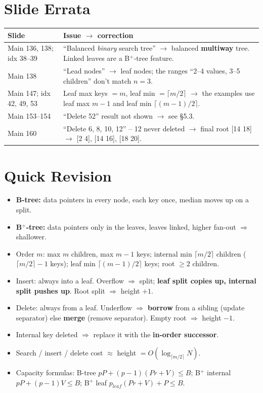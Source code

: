 \documentclass[10pt,a4paper]{article}
\begin{document}
\section{Slide Errata}
\begin{tabularx}{\linewidth}{@{}l X@{}}
\toprule
\textbf{Slide} & \textbf{Issue $\to$ correction}\\\midrule
Main 136, 138; idx 38--39 & ``Balanced \emph{binary} search tree'' $\to$ balanced \textbf{multiway} tree. Linked leaves are a B$^+$-tree feature.\\
Main 138 & ``Lead nodes'' $\to$ leaf nodes; the ranges ``2--4 values, 3--5 children'' don't match $n=3$.\\
Main 147; idx 42, 49, 53 & Leaf max keys $=m$, leaf min $=\lceil m/2 \rceil$ $\to$ the examples use leaf max $m-1$ and leaf min $\lceil (m-1)/2 \rceil$.\\
Main 153--154 & ``Delete 52'' result not shown $\to$ see \S5.3.\\
Main 160 & ``Delete 6, 8, 10, 12'' -- 12 never deleted $\to$ final root [14 18] $\to$ [2 4], [14 16], [18 20].\\
\bottomrule
\end{tabularx}

\section{Quick Revision}
\begin{itemize}
  \item \textbf{B-tree:} data pointers in every node, each key once, median moves up on a split.
  \item \textbf{B$^+$-tree:} data pointers only in the leaves, leaves linked, higher fan-out $\Rightarrow$ shallower.
  \item Order $m$: max $m$ children, max $m-1$ keys; internal min $\lceil m/2 \rceil$ children ($\lceil m/2 \rceil-1$ keys); leaf min $\lceil (m-1)/2 \rceil$ keys; root $\ge 2$ children.
  \item Insert: always into a leaf. Overflow $\Rightarrow$ split; \textbf{leaf split copies up, internal split pushes up}. Root split $\Rightarrow$ height $+1$.
  \item Delete: always from a leaf. Underflow $\Rightarrow$ \textbf{borrow} from a sibling (update separator) else \textbf{merge} (remove separator). Empty root $\Rightarrow$ height $-1$.
  \item Internal key deleted $\Rightarrow$ replace it with the \textbf{in-order successor}.
  \item Search / insert / delete cost $\approx$ height $= O(\log_{\lceil m/2\rceil} N)$.
  \item Capacity formulas: B-tree $pP+(p-1)(Pr+V)\le B$; B$^+$ internal $pP+(p-1)V\le B$; B$^+$ leaf $p_{leaf}(Pr+V)+P\le B$.
\end{itemize}
\end{document}
